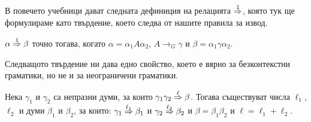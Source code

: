 В повечето учебници дават следната дефиниция на релацията $\stackrel{{1}}{\Rightarrow}$, която тук ще формулираме като твърдение, което следва от нашите правила за извод.
\begin{proposition}
  $\alpha \stackrel{{1}}{\Rightarrow} \beta$ точно тогава, когато $\alpha = \alpha_1 A \alpha_2$, $A \to_G \gamma$ и $\beta = \alpha_1 \gamma \alpha_2$.
\end{proposition}

Следващото твърдение ни дава едно свойство, което е вярно за безконтекстни граматики, но не и за неограничени граматики.
\begin{proposition}\label{pr:grammar:divide-2}
  Нека $\gamma_1$ и $\gamma_2$ са непразни думи, за които $\gamma_1\gamma_2 \stackrel{{\ell}}{\Rightarrow} \beta$. Тогава
  съществуват числа $\ell_1$, $\ell_2$ и думи $\beta_1$ и $\beta_2$, за които:
  $\gamma_1 \stackrel{{\ell_1}}{\Rightarrow} \beta_1$ и $\gamma_2 \stackrel{{\ell_2}}{\Rightarrow} \beta_2$ и $\beta = \beta_1\beta_2$ и $\ell = \ell_1 + \ell_2$.
\end{proposition}
